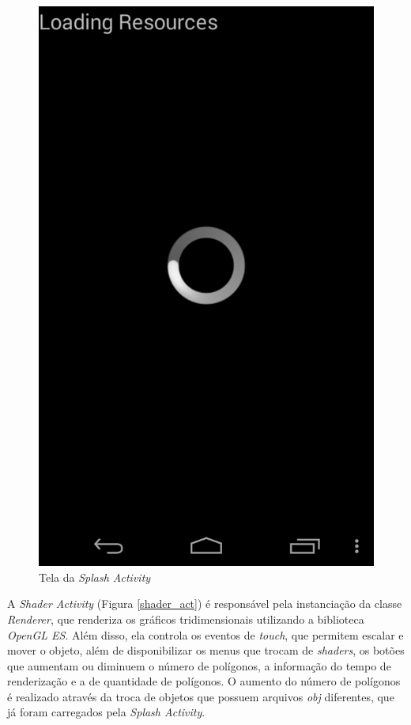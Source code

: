 	\begin{figure}[ht]
	\centering
		\includegraphics[keepaspectratio=true,scale=0.2]{figuras/splash_act.png}
	\caption{Tela da \textit{Splash Activity}}
	\label{splash_act}
	\end{figure}

	A \textit{Shader Activity} (Figura  \ref{shader_act}) é responsável pela  instanciação da classe \textit{Renderer}, que renderiza os gráficos tridimensionais utilizando a biblioteca \textit{OpenGL ES}. Além disso, ela controla os eventos de \textit{touch}, que permitem escalar e mover o objeto, além de disponibilizar os menus que trocam de \textit{shaders}, os botões que aumentam ou diminuem o número de polígonos, a informação do tempo de renderização e a de quantidade de polígonos. O aumento do número de polígonos é realizado através da troca de objetos que possuem arquivos \textit{obj} diferentes, que já foram carregados pela \textit{Splash Activity}. 

